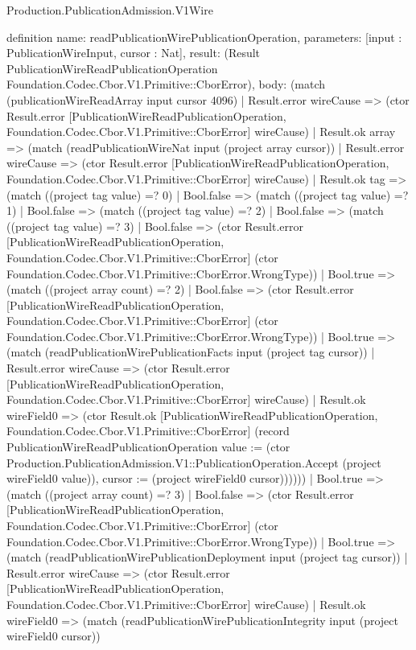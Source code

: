 \begin{lexlean}{Production.PublicationAdmission.V1Wire}
\begin{semanticmodule}
definition{
  name: readPublicationWirePublicationOperation,
  parameters: [input : PublicationWireInput, cursor : Nat],
  result: (Result PublicationWireReadPublicationOperation Foundation.Codec.Cbor.V1.Primitive::CborError),
  body: (match (publicationWireReadArray input cursor 4096)
    | Result.error wireCause => (ctor Result.error [PublicationWireReadPublicationOperation, Foundation.Codec.Cbor.V1.Primitive::CborError] wireCause)
    | Result.ok array => (match (readPublicationWireNat input (project array cursor))
      | Result.error wireCause => (ctor Result.error [PublicationWireReadPublicationOperation, Foundation.Codec.Cbor.V1.Primitive::CborError] wireCause)
      | Result.ok tag => (match ((project tag value) =? 0)
        | Bool.false => (match ((project tag value) =? 1)
          | Bool.false => (match ((project tag value) =? 2)
            | Bool.false => (match ((project tag value) =? 3)
              | Bool.false => (ctor Result.error [PublicationWireReadPublicationOperation, Foundation.Codec.Cbor.V1.Primitive::CborError] (ctor Foundation.Codec.Cbor.V1.Primitive::CborError.WrongType))
              | Bool.true => (match ((project array count) =? 2)
                | Bool.false => (ctor Result.error [PublicationWireReadPublicationOperation, Foundation.Codec.Cbor.V1.Primitive::CborError] (ctor Foundation.Codec.Cbor.V1.Primitive::CborError.WrongType))
                | Bool.true => (match (readPublicationWirePublicationFacts input (project tag cursor))
                  | Result.error wireCause => (ctor Result.error [PublicationWireReadPublicationOperation, Foundation.Codec.Cbor.V1.Primitive::CborError] wireCause)
                  | Result.ok wireField0 => (ctor Result.ok [PublicationWireReadPublicationOperation, Foundation.Codec.Cbor.V1.Primitive::CborError] (record PublicationWireReadPublicationOperation {value := (ctor Production.PublicationAdmission.V1::PublicationOperation.Accept (project wireField0 value)), cursor := (project wireField0 cursor)})))))
            | Bool.true => (match ((project array count) =? 3)
              | Bool.false => (ctor Result.error [PublicationWireReadPublicationOperation, Foundation.Codec.Cbor.V1.Primitive::CborError] (ctor Foundation.Codec.Cbor.V1.Primitive::CborError.WrongType))
              | Bool.true => (match (readPublicationWirePublicationDeployment input (project tag cursor))
                | Result.error wireCause => (ctor Result.error [PublicationWireReadPublicationOperation, Foundation.Codec.Cbor.V1.Primitive::CborError] wireCause)
                | Result.ok wireField0 => (match (readPublicationWirePublicationIntegrity input (project wireField0 cursor))
}
\end{semanticmodule}
\end{lexlean}

